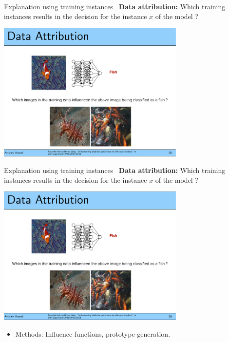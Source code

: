 \documentclass[aspectratio=169]{../latex_main/tntbeamer}  %
\begin{document}
\begin{frame}[c]{Explanation using training instances~}
	\vspace{-1em}
	\textbf{Data attribution:} Which training instances results in the decision for the instance $x$ of the model ?
	\begin{center}
		\includegraphics[page=1, width=0.7\textwidth]{./figure/fish-attribution.pdf}
	\end{center}
	
\end{frame}

\begin{frame}[c]{Explanation using training instances~}
	\vspace{-1em}
	\textbf{Data attribution:} Which training instances results in the decision for the instance $x$ of the model ?
	\begin{center}
		\includegraphics[page=1, width=0.7\textwidth]{./figure/prototypes-fish.pdf}
	\end{center}
	\begin{itemize}
		\item Methods: 
		Influence functions, prototype generation.
	\end{itemize}
\end{frame}
\end{document}
